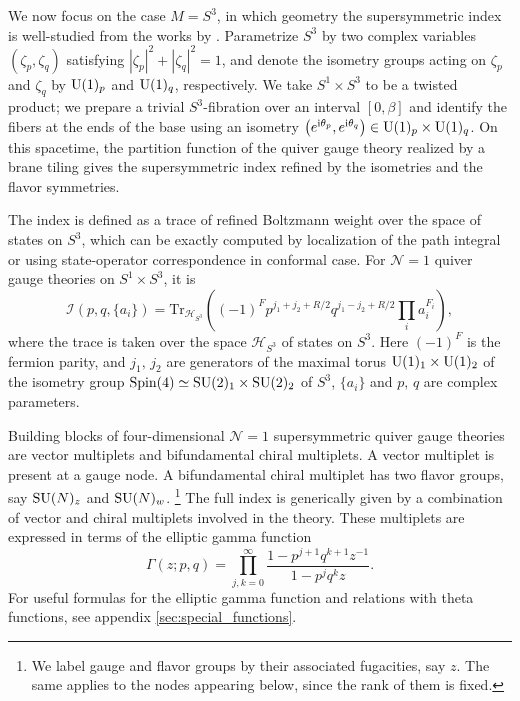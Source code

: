 We now focus on the case $M=S^{3}$, in which geometry the supersymmetric
index is well-studied from the works by \cite{Romelsberger:2005eg,Kinney:2005ej,Festuccia:2011ws,Closset:2013vra}.
Parametrize $S^{3}$ by two complex variables
$(\zeta_{p},\zeta_{q})$ satisfying $|\zeta_{p}|^{2}+|\zeta_{q}|^{2}=1$,
and denote the isometry groups acting on $\zeta_{p}$ and $\zeta_{q}$
by $\mathrm{U}(1)_{p}$ and $\mathrm{U}(1)_{q}$, respectively. We take $S^{1}\times S^{3}$
to be a twisted product; we prepare a trivial $S^{3}$-fibration over
an interval $[0,\beta]$ and identify the fibers at the ends of the
base using an isometry $\left(e^{\mathrm{i}\theta_{p}},e^{\mathrm{i}\theta_{q}}\right)\in \mathrm{U}(1)_{p}\times \mathrm{U}(1)_{q}$.
On this spacetime, the partition function of the quiver gauge theory
realized by a brane tiling gives the supersymmetric index refined
by the isometries and the flavor symmetries.

The index is defined as a trace of refined Boltzmann weight over the
space of states on $S^{3}$, which can be exactly computed by localization of the path integral
or using state-operator correspondence in conformal case.
For $\mathcal{N}=1$ quiver gauge theories on $S^{1}\times S^{3}$, it is
\begin{equation}
    \mathcal{I}(p,q,\{ a_{i}\} )
      =  \mathrm{Tr}_{\mathcal{H}_{S^{3}}}
      \left(    (-1)^{F}  p^{j_{1}+j_{2}+R/2}  q^{j_{1}-j_{2}+R/2}  \prod_{i}a_{i}^{F_{i}}    \right),
\end{equation}
where the trace is taken over the space $\mathcal{H}_{S^{3}}$ of states on $S^{3}$.
Here $\left(-1\right)^{F}$ is the fermion parity, and $j_{1},\,j_{2}$
are generators of the maximal torus $\mathrm{U}(1)_{1}\times \mathrm{U}(1)_{2}$ of
the isometry group $\mathrm{Spin}(4)\simeq \mathrm{SU}(2)_{1}\times \mathrm{SU}(2)_{2}$ of $S^{3}$,
$\{ a_i \}$ and $p,\,q$ are complex parameters.


Building blocks of four-dimensional $\mathcal{N}=1$ supersymmetric quiver gauge
theories are vector multiplets and bifundamental chiral multiplets.
A vector multiplet is present at a gauge node. A bifundamental chiral
multiplet has two flavor groups, say $\mathrm{SU}(N)_{z}$ and $\mathrm{SU}(N)_{w}$.%
%
\footnote{We label gauge and flavor groups by their associated fugacities, say $z$.
The same applies to the nodes appearing below, since the rank of them is fixed.}
%
The full index is generically given by a combination of vector and chiral
multiplets involved in the theory. These multiplets are expressed
in terms of the elliptic gamma function
\begin{equation}
    \Gamma(z;p,q)  =  \prod_{j,k=0}^{\infty}  \frac{1-p^{j+1}q^{k+1}z^{-1}}{1-p^{j}q^{k}z}
  .
\end{equation}
For useful formulas for the elliptic gamma function and
relations with theta functions, see appendix \ref{sec:special_functions}.




